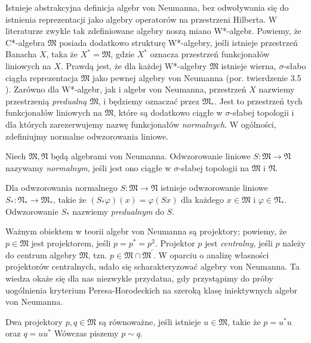 Istnieje abstrakcyjna definicja algebr von Neumanna, bez odwoływania się
do istnienia reprezentacji jako algebry operatorów na przestrzeni Hilberta.
W literaturze zwykle tak zdefiniowane algebry noszą miano W*-algebr.
Powiemy, że C*-algebra $\mathfrak{M}$ posiada dodatkowo strukturę W*-algebry,
jeśli istnieje przestrzeń Banacha $X$, taka że
$X^{*} = \mathfrak{M}$,
gdzie $X^{*}$ oznacza przestrzeń funkcjonałów liniowych na $X$.
Prawdą jest, że dla każdej W*-algebry $\mathfrak{M}$ istnieje wierna,
$\sigma$-słabo ciągła reprezentacja $\mathfrak{M}$ jako pewnej algebry von Neumanna
(por. twierdzenie 3.5 \cite{Takesaki1}).
Zarówno dla W*-algebr, jak i algebr von Neumanna,
przestrzeń $X$ nazwiemy przestrzenią \emph{predualną} $\mathfrak{M}$,
i będziemy oznaczać przez $\mathfrak{M}_{*}$.
Jest to przestrzeń tych funkcjonałów liniowych na $\mathfrak{M}$, które
są dodatkowo ciągłe w $\sigma$-słabej topologii i dla których zarezerwujemy
nazwę funkcjonałów \emph{normalnych}.
W ogólności, zdefiniujmy normalne odwzorowania liniowe.
\begin{Definition}
    \label{def:normalMap}
    Niech $\mathfrak{M}, \mathfrak{N}$ będą algebrami von Neumanna.
    Odwzorowanie liniowe $S: \mathfrak{M} \rightarrow \mathfrak{N}$
    nazywamy \emph{normalnym}, jeśli
    jest ono ciągłe w $\sigma$-słabej topologii na $\mathfrak{M}$ i $\mathfrak{N}$.
\end{Definition}
Dla odwzorowania normalnego $S: \mathfrak{M} \rightarrow \mathfrak{N}$
istnieje odwzorowanie liniowe $S_{*}: \mathfrak{N}_{*} \rightarrow \mathfrak{M}_{*}$,
takie że $(S_{*} \varphi) (x) = \varphi(Sx)$ dla każdego
$x \in \mathfrak{M}$ i $\varphi \in \mathfrak{N}_*$.
Odwzorowanie $S_{*}$ nazwiemy \emph{predualnym} do $S$.

Ważnym obiektem w teorii algebr von Neumanna są projektory; powiemy, że
$p \in \mathfrak{M}$ jest projektorem, jeśli $p = p^{*} = p^{2}$.
Projektor $p$ jest \emph{centralny}, jeśli
$p$ należy do centrum algebry $\mathfrak{M}$, tzn.
$p \in \mathfrak{M} \cap \mathfrak{M}^{\prime}$.
W oparciu o analizę własności projektorów centralnych,
udało się scharakteryzować algebry von Neumanna.
Ta wiedza okaże się dla nas niezwykle przydatna, gdy przystąpimy do próby
uogólnienia kryterium Peresa-Horodeckich na szeroką klasę iniektywnych algebr von Neumanna.

\begin{Definition}
Dwa projektory $p, q \in \mathfrak{M}$ są równoważne,
jeśli istnieje $u \in \mathfrak{M}$, takie że
$p = u^{*} u$ oraz $ q = u u^{*}$
Wówczas piszemy $p \sim q$.
\end{Definition}

